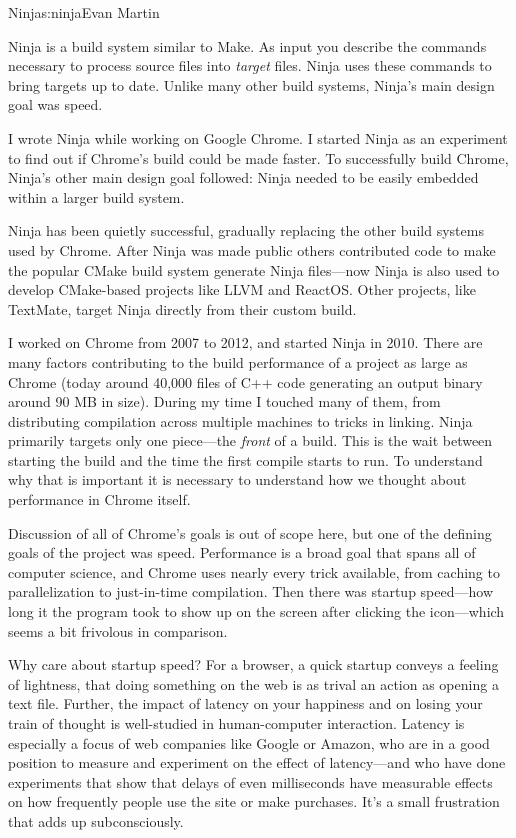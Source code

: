 \begin{aosachapter}{Ninja}{s:ninja}{Evan Martin}

Ninja is a build system similar to Make. As input you describe the
commands necessary to process source files into \emph{target} files.
Ninja uses these commands to bring targets up to date. Unlike many other
build systems, Ninja's main design goal was speed.

I wrote Ninja while working on Google Chrome. I started Ninja as an
experiment to find out if Chrome's build could be made faster. To
successfully build Chrome, Ninja's other main design goal followed:
Ninja needed to be easily embedded within a larger build system.

Ninja has been quietly successful, gradually replacing the other build
systems used by Chrome. After Ninja was made public others contributed
code to make the popular CMake build system generate Ninja files---now
Ninja is also used to develop CMake-based projects like LLVM and
ReactOS. Other projects, like TextMate, target Ninja directly from their
custom build.

I worked on Chrome from 2007 to 2012, and started Ninja in 2010. There
are many factors contributing to the build performance of a project as
large as Chrome (today around 40,000 files of C++ code generating an
output binary around 90 MB in size). During my time I touched many of
them, from distributing compilation across multiple machines to tricks
in linking. Ninja primarily targets only one piece---the \emph{front} of
a build. This is the wait between starting the build and the time the
first compile starts to run. To understand why that is important it is
necessary to understand how we thought about performance in Chrome
itself.


Discussion of all of Chrome's goals is out of scope here, but one of the
defining goals of the project was speed. Performance is a broad goal
that spans all of computer science, and Chrome uses nearly every trick
available, from caching to parallelization to just-in-time compilation.
Then there was startup speed---how long it the program took to show up
on the screen after clicking the icon---which seems a bit frivolous in
comparison.

Why care about startup speed? For a browser, a quick startup conveys a
feeling of lightness, that doing something on the web is as trival an
action as opening a text file. Further, the impact of latency on your
happiness and on losing your train of thought is well-studied in
human-computer interaction. Latency is especially a focus of web
companies like Google or Amazon, who are in a good position to measure
and experiment on the effect of latency---and who have done experiments
that show that delays of even milliseconds have measurable effects on
how frequently people use the site or make purchases. It's a small
frustration that adds up subconsciously.


\end{aosachapter}
